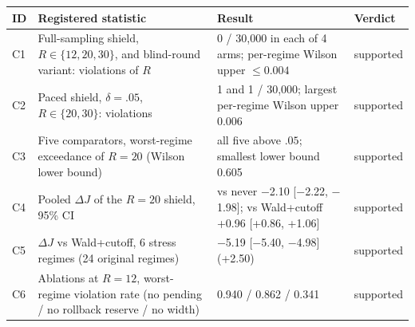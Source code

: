 \begin{tabular}{@{}l p{4.8cm} p{7.2cm} l@{}}
\toprule
ID & Registered statistic & Result & Verdict \\
\midrule
C1 & Full-sampling shield, $R\in\{12,20,30\}$, and blind-round variant: violations of $R$ & 0 / 30{,}000 in each of 4 arms; per-regime Wilson upper $\le 0.004$ & supported \\
C2 & Paced shield, $\delta=.05$, $R\in\{20,30\}$: violations & 1 and 1 / 30{,}000; largest per-regime Wilson upper 0.006 & supported \\
C3 & Five comparators, worst-regime exceedance of $R=20$ (Wilson lower bound) & all five above $.05$; smallest lower bound 0.605 & supported \\
C4 & Pooled $\Delta J$ of the $R=20$ shield, 95\% CI & vs never $-$2.10 [$-$2.22, $-$1.98]; vs Wald+cutoff +0.96 [+0.86, +1.06] & supported \\
C5 & $\Delta J$ vs Wald+cutoff, 6 stress regimes (24 original regimes) & $-$5.19 [$-$5.40, $-$4.98] (+2.50) & supported \\
C6 & Ablations at $R=12$, worst-regime violation rate (no pending / no rollback reserve / no width) & 0.940 / 0.862 / 0.341 & supported \\
\bottomrule
\end{tabular}
